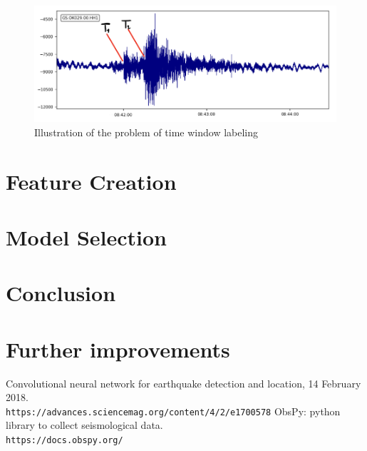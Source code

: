 \documentclass[10pt,conference,compsocconf]{IEEEtran}
\begin{document}
\begin{figure}[h]
  \centering
	\includegraphics[width=\columnwidth]{../processed-data/problem-time-window-labeling.png}
  \caption{Illustration of the problem of time window labeling}
	\label{fig:problem-discretization}
\end{figure}

\section{Feature Creation}

\section{Model Selection}

\section{Conclusion}

\section{Further improvements}

\begin{thebibliography}{9}
Convolutional neural network for earthquake detection and location, 14 February 2018. \\\texttt{https://advances.sciencemag.org/content/4/2/e1700578}
ObsPy: python library to collect seismological data.
\\\texttt{https://docs.obspy.org/}
\end{thebibliography}
\end{document}
